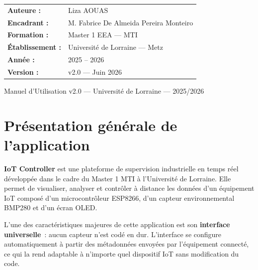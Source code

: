 \documentclass[a4paper,12pt]{article}
\begin{document}
\begin{titlepage}
\vspace{1.8cm}
\begin{center}
\begin{tcolorbox}[
  enhanced, colback=LightBlue!50, colframe=BorderGray,
  boxrule=0.8pt, arc=4pt, width=0.72\textwidth,
]
\renewcommand{\arraystretch}{1.5}
\begin{tabular}{@{}ll@{}}
  \textbf{\color{PrimaryBlue}Auteure :}        & Liza AOUAS \\
  \textbf{\color{PrimaryBlue}Encadrant :}      & M. Fabrice De Almeida Pereira Monteiro \\
  \textbf{\color{PrimaryBlue}Formation :}      & Master 1 EEA --- MTI \\
  \textbf{\color{PrimaryBlue}\'Etablissement :}& Universit\'e de Lorraine --- Metz \\
  \textbf{\color{PrimaryBlue}Ann\'ee :}        & 2025 -- 2026 \\
  \textbf{\color{PrimaryBlue}Version :}        & v2.0 --- Juin 2026 \\
\end{tabular}
\end{tcolorbox}
\end{center}

\vfill
\begin{center}
  {\color{white}\small Manuel d'Utilisation v2.0 --- Universit\'e de Lorraine --- 2025/2026}
\end{center}
\end{titlepage}
\restoregeometry

\thispagestyle{fancy}
\tableofcontents
\newpage

\section{Pr\'esentation g\'en\'erale de l'application}

\textbf{IoT Controller} est une plateforme de supervision industrielle en temps r\'eel
d\'evelopp\'ee dans le cadre du Master 1 MTI \`a l'Universit\'e de Lorraine.
Elle permet de visualiser, analyser et contr\^oler \`a distance les donn\'ees d'un
\'equipement IoT compos\'e d'un microcontr\^oleur ESP8266, d'un capteur environnemental
BMP280 et d'un \'ecran OLED.

L'une des caract\'eristiques majeures de cette application est son \textbf{interface universelle}~:
aucun capteur n'est cod\'e en dur. L'interface se configure automatiquement \`a partir des
m\'etadonn\'ees envoy\'ees par l'\'equipement connect\'e, ce qui la rend adaptable \`a
n'importe quel dispositif IoT sans modification du code.
\end{document}

